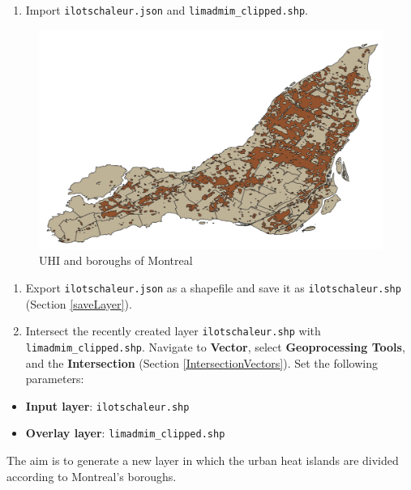 \documentclass[]{book}
\providecommand{\tightlist}{%
  \setlength{\itemsep}{0pt}\setlength{\parskip}{0pt}}
\theoremstyle{definition}
\theoremstyle{definition}
\theoremstyle{definition}
\theoremstyle{remark}
\begin{document}
\begin{enumerate}
\def\labelenumi{\arabic{enumi}.}
\tightlist
\item
  Import \texttt{ilotschaleur.json} and \texttt{limadmim\_clipped.shp}.
\end{enumerate}

\begin{figure}

{\centering \includegraphics[width=15.1in]{figures/UHA_Montreal} 

}

\caption{UHI and boroughs of Montreal}\label{fig:unnamed-chunk-27}
\end{figure}

\begin{enumerate}
\def\labelenumi{\arabic{enumi}.}
\setcounter{enumi}{1}
\item
  Export \texttt{ilotschaleur.json} as a shapefile and save it as
  \texttt{ilotschaleur.shp} (Section \ref{saveLayer}).
\item
  Intersect the recently created layer \texttt{ilotschaleur.shp} with
  \texttt{limadmim\_clipped.shp}. Navigate to \textbf{Vector}, select
  \textbf{Geoprocessing Tools}, and the \textbf{Intersection} (Section
  \ref{IntersectionVectors}). Set the following parameters:
\end{enumerate}

\begin{itemize}
\tightlist
\item
  \textbf{Input layer}: \texttt{ilotschaleur.shp}
\item
  \textbf{Overlay layer}: \texttt{limadmim\_clipped.shp}
\end{itemize}

The aim is to generate a new layer in which the urban heat islands are
divided according to Montreal's boroughs.
\end{document}
